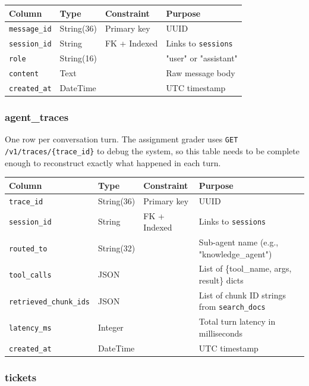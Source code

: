 \documentclass[12pt,a4paper]{article}
\begin{document}
\begin{center}
\begin{tabular}{llll}
\toprule
\textbf{Column} & \textbf{Type} & \textbf{Constraint} & \textbf{Purpose} \\
\midrule
\texttt{message\_id} & String(36) & Primary key & UUID \\
\texttt{session\_id} & String & FK + Indexed & Links to \texttt{sessions} \\
\texttt{role} & String(16) & & "user" or "assistant" \\
\texttt{content} & Text & & Raw message body \\
\texttt{created\_at} & DateTime & & UTC timestamp \\
\bottomrule
\end{tabular}
\end{center}

\subsubsection{agent\_traces}

One row per conversation turn. The assignment grader uses \texttt{GET /v1/traces/\{trace\_id\}} to debug the system, so this table needs to be complete enough to reconstruct exactly what happened in each turn.

\begin{center}
\begin{tabular}{llll}
\toprule
\textbf{Column} & \textbf{Type} & \textbf{Constraint} & \textbf{Purpose} \\
\midrule
\texttt{trace\_id} & String(36) & Primary key & UUID \\
\texttt{session\_id} & String & FK + Indexed & Links to \texttt{sessions} \\
\texttt{routed\_to} & String(32) & & Sub-agent name (e.g., "knowledge\_agent") \\
\texttt{tool\_calls} & JSON & & List of \{tool\_name, args, result\} dicts \\
\texttt{retrieved\_chunk\_ids} & JSON & & List of chunk ID strings from \texttt{search\_docs} \\
\texttt{latency\_ms} & Integer & & Total turn latency in milliseconds \\
\texttt{created\_at} & DateTime & & UTC timestamp \\
\bottomrule
\end{tabular}
\end{center}

\subsubsection{tickets}
\end{document}
